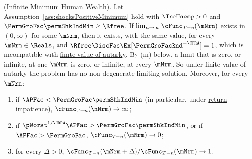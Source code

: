 \documentclass[\econtexRoot/BufferStockTheory]{subfiles}
\begin{document}
\begin{proposition}(Infinite Minimum Human Wealth).\label{prop:InfiniteMinHumanWealth}
Let Assumption~\ref{ass:shocksPositiveMinimum} hold with $\IncUnemp>0$ and $\PermGroFac\permShkIndMin\geq\Rfree$.
If $\lim_{n\rightarrow\infty}\cFunc_{T-n}(\mNrm)$ exists in $(0,\infty)$ for some $\mNrm$, then it exists, with the same value, for every $\mNrm\in\Reals$, and $\Rfree\DiscFac\Ex[\PermGroFacRnd^{-\CRRA}]=1$, which is incompatible with \hyperlink{FVAC}{finite value of autarky}.
By (iii) below, a limit that is zero, or infinite, at one $\mNrm$ is zero, or infinite, at every $\mNrm$.
So under finite value of autarky the problem has no non-degenerate limiting solution.
Moreover, for every $\mNrm$:
\begin{enumerate}[label=(\roman*)]
\item if $\APFac<\PermGroFac\permShkIndMin$ (in particular, under \hyperlink{RIC}{return impatience}), $\cFunc_{T-n}(\mNrm)\rightarrow\infty$;
\item if $\pWorst^{1/\CRRA}\APFac>\PermGroFac\permShkIndMin$, or if $\APFac>\PermGroFac$, $\cFunc_{T-n}(\mNrm)\rightarrow 0$;
\item for every $\Delta>0$, $\cFunc_{T-n}(\mNrm+\Delta)/\cFunc_{T-n}(\mNrm)\rightarrow 1$.
\end{enumerate}
\end{proposition}
\end{document}
